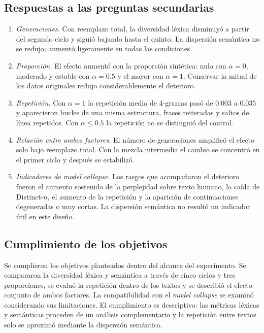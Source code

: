 \documentclass[12pt,letterpaper]{article}
\begin{document}
\subsection{Respuestas a las preguntas secundarias}

\begin{enumerate}
    \item \textit{Generaciones.} Con reemplazo total, la diversidad léxica
    disminuyó a partir del segundo ciclo y siguió bajando hasta el quinto.
    La dispersión semántica no se redujo; aumentó ligeramente en todas las
    condiciones.
    \item \textit{Proporción.} El efecto aumentó con la proporción
    sintética: nulo con \(\alpha=0\), moderado y estable con
    \(\alpha=0.5\) y el mayor con \(\alpha=1\). Conservar la mitad de los
    datos originales redujo considerablemente el deterioro.
    \item \textit{Repetición.} Con \(\alpha=1\) la repetición media de
    4-gramas pasó de 0.003 a 0.035 y aparecieron bucles de una misma
    estructura, frases reiteradas y saltos de línea repetidos. Con
    \(\alpha\le0.5\) la repetición no se distinguió del control.
    \item \textit{Relación entre ambos factores.} El número de
    generaciones amplificó el efecto solo bajo reemplazo total. Con la
    mezcla intermedia el cambio se concentró en el primer ciclo y después
    se estabilizó.
    \item \textit{Indicadores de model collapse.} Los rasgos que
    acompañaron el deterioro fueron el aumento sostenido de la perplejidad
    sobre texto humano, la caída de Distinct-\(n\), el aumento de la
    repetición y la aparición de continuaciones degeneradas o muy cortas.
    La dispersión semántica no resultó un indicador útil en este diseño.
\end{enumerate}

\subsection{Cumplimiento de los objetivos}

Se cumplieron los objetivos planteados dentro del alcance del
experimento. Se compararon la diversidad léxica y semántica a través de
cinco ciclos y tres proporciones, se evaluó la repetición dentro de los
textos y se describió el efecto conjunto de ambos factores. La
compatibilidad con el \textit{model collapse} se examinó considerando sus
limitaciones. El cumplimiento es descriptivo: las métricas léxicas y
semánticas proceden de un análisis complementario y la repetición entre
textos solo se aproximó mediante la dispersión semántica.
\end{document}
